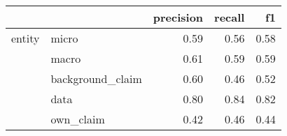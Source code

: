 \begin{tabular}{llrrr}
\toprule
       &           &  precision &  recall &   f1 \\
\midrule
entity & micro &       0.59 &    0.56 & 0.58 \\
       & macro &       0.61 &    0.59 & 0.59 \\
       & background\_claim &       0.60 &    0.46 & 0.52 \\
       & data &       0.80 &    0.84 & 0.82 \\
       & own\_claim &       0.42 &    0.46 & 0.44 \\
\bottomrule
\end{tabular}
